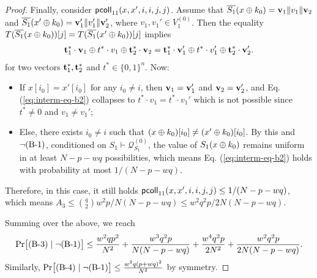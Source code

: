 \begin{proof}
Finally, consider $\mathsf{pcoll}_{11}(x,x',i,i,j,j)$. Assume that $\overline{S_1}(x\oplus k_0)=\mathbf{v}_1\|v_1\|\mathbf{v}_2$ and
$\overline{S_1}(x'\oplus k_0)=\mathbf{v}_1'\|v_1'\|\mathbf{v}_2'$, where $v_1,v_1'\in V_1^{(0)}$. Then the equality $T(\overline{S_1}(x\oplus k_0))[j]=T(\overline{S_1}(x'\oplus k_0))[j]$ implies
%
\begin{align}
\mathbf{t}_1^*\cdot\mathbf{v}_1\oplus t^*\cdot v_1\oplus\mathbf{t}_2^*\cdot\mathbf{v}_2=\mathbf{t}_1^*\cdot\mathbf{v}_1'\oplus t^*\cdot v_1'\oplus\mathbf{t}_2^*\cdot\mathbf{v}_2'.
\label{eq:interm-eq-b2}
\end{align}
%
%
for two vectors $\mathbf{t}_1^*,\mathbf{t}_2^*$ and $t^*\in\{0,1\}^n$. Now:
\begin{itemize}
	\item If $x[i_0]=x'[i_0]$ for any $i_0\neq i$, then $\mathbf{v}_1=\mathbf{v}_1'$ and $\mathbf{v}_2=\mathbf{v}_2'$, and Eq. (\ref{eq:interm-eq-b2}) collapses to $t^*\cdot v_1=t^*\cdot v_1'$ which is not possible since $t^*\neq 0$ and $v_1\neq v_1'$;
	\item Else, there exists $i_0\neq i$ such that $(x\oplus k_0)[i_0]\neq(x'\oplus k_0)[i_0]$. By this and $\neg\text{(B-1)}$, conditioned on $S_1\vdash\mathcal{Q}_{S_{1}}^{(0)}$, the value of $S_1(x\oplus k_0)$ remains uniform in at least $N-p-wq$ possibilities, which means Eq. (\ref{eq:interm-eq-b2}) holds with probability at most $1/(N-p-wq)$.
\end{itemize}
Therefore, in this case, it still holds $\mathsf{pcoll}_{11}(x,x',i,i,j,j)\leq1/(N-p-wq)$, which means $A_3\leq{q\choose2}w^2p/N(N-p-wq)\leq w^2q^2p/2N(N-p-wq)$.


Summing over the above, we reach
%
$${\Pr}\big[\text{(B-3)}\mid\neg\text{(B-1)}\big]\leq\frac{w^2qp^2}{N^2}
+
\frac{w^3q^2p}{N(N-p-wq)}
+
\frac{w^4q^2p}{2N^2}
+
\frac{w^2q^2p}{2N(N-p-wq)}.$$
%
Similarly, ${\Pr}\big[\text{(B-4)}\mid\neg\text{(B-1)}\big] \leq \frac{w^{2} q \left(p+w q\right)^{2}}{N^{2}}$ by symmetry.





\end{proof}
